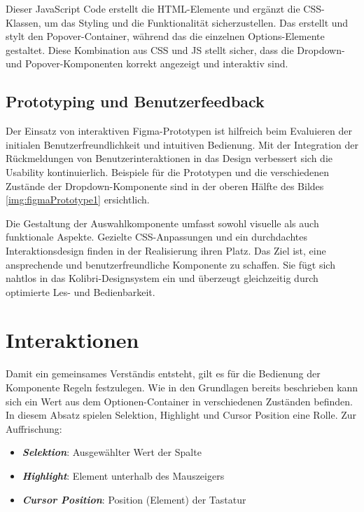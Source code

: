 Dieser JavaScript Code erstellt die HTML-Elemente und ergänzt die CSS-Klassen, um das Styling und die Funktionalität sicherzustellen. 
Das  erstellt und stylt den Popover-Container, während das  die einzelnen Options-Elemente gestaltet.
Diese Kombination aus CSS und JS stellt sicher, dass die Dropdown- und Popover-Komponenten korrekt angezeigt und interaktiv sind.


\subsection{Prototyping und Benutzerfeedback}
\label{sec:userFeedbackPtototyping}

Der Einsatz von interaktiven Figma-Prototypen ist hilfreich beim Evaluieren der initialen Benutzerfreundlichkeit und intuitiven Bedienung. 
Mit der Integration der Rückmeldungen von Benutzerinteraktionen in das Design verbessert sich die Usability kontinuierlich.
Beispiele für die Prototypen und die verschiedenen Zustände der Dropdown-Komponente sind in der oberen Hälfte des Bildes \ref{img:figmaPrototype1} ersichtlich.

Die Gestaltung der Auswahlkomponente umfasst sowohl visuelle als auch funktionale Aspekte. 
Gezielte CSS-Anpassungen und ein durchdachtes Interaktionsdesign finden in der Realisierung ihren Platz. 
Das Ziel ist, eine ansprechende und benutzerfreundliche Komponente zu schaffen. 
Sie fügt sich nahtlos in das Kolibri-Designsystem ein und überzeugt gleichzeitig durch optimierte Les- und Bedienbarkeit.


\section{Interaktionen}
\label{sec:interaction}

Damit ein gemeinsames Verständis entsteht, gilt es für die Bedienung der Komponente Regeln festzulegen.
Wie in den Grundlagen bereits beschrieben kann sich ein Wert aus dem Optionen-Container in verschiedenen Zuständen befinden.
In diesem Absatz spielen Selektion, Highlight und Cursor Position eine Rolle.
Zur Auffrischung: 

\begin{itemize}
    \item \textbf{\emph{Selektion}}: Ausgewählter Wert der Spalte
    \item \textbf{\emph{Highlight}}: Element unterhalb des Mauszeigers
    \item \textbf{\emph{Cursor Position}}: Position (Element) der Tastatur
\end{itemize}

